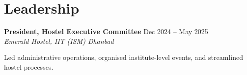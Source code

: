 \documentclass[11pt, a4paper]{article}
\newcommand{\entry}[4]{%
  \noindent\textbf{#1} \hfill #2 \\
  \textit{#3} \hfill #4 \par
  \vspace{0.3em}
}
\begin{document}
\section*{Leadership}
\entry{President, Hostel Executive Committee}{Dec 2024 -- May 2025}
{Emerald Hostel, IIT (ISM) Dhanbad}{}
\noindent Led administrative operations, organised institute-level events, and streamlined
hostel processes.
\end{document}
